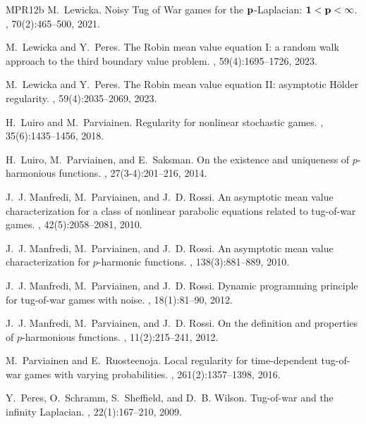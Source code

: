 \documentclass[english]{amsart}
\theoremstyle{plain}
\theoremstyle{definition}
\theoremstyle{remark}
\numberwithin{equation}{section}
\begin{document}
\begin{thebibliography}{MPR12b}
M.~Lewicka.
\newblock Noisy {T}ug of {W}ar games for the {$\bold p$}-{L}aplacian: {$\bold
  1<\bold p<\infty$}.
, 70(2):465--500, 2021.

M.~Lewicka and Y.~Peres.
\newblock The {R}obin mean value equation {I}: a random walk approach to the
  third boundary value problem.
, 59(4):1695--1726, 2023.

M.~Lewicka and Y.~Peres.
\newblock The {R}obin mean value equation {II}: asymptotic {H}\"{o}lder
  regularity.
, 59(4):2035--2069, 2023.


H.~Luiro and M.~Parviainen.
\newblock Regularity for nonlinear stochastic games.
,
  35(6):1435--1456, 2018.

H.~Luiro, M.~Parviainen, and E.~Saksman.
\newblock On the existence and uniqueness of {$p$}-harmonious functions.
, 27(3-4):201--216, 2014.

J.~J. Manfredi, M.~Parviainen, and J.~D. Rossi.
\newblock An asymptotic mean value characterization for a class of nonlinear
  parabolic equations related to tug-of-war games.
, 42(5):2058--2081, 2010.

J.~J. Manfredi, M.~Parviainen, and J.~D. Rossi.
\newblock An asymptotic mean value characterization for {$p$}-harmonic
  functions.
, 138(3):881--889, 2010.

J.~J. Manfredi, M.~Parviainen, and J.~D. Rossi.
\newblock Dynamic programming principle for tug-of-war games with noise.
, 18(1):81--90, 2012.

J.~J. Manfredi, M.~Parviainen, and J.~D. Rossi.
\newblock On the definition and properties of {$p$}-harmonious functions.
, 11(2):215--241, 2012.

M.~Parviainen and E.~Ruosteenoja.
\newblock Local regularity for time-dependent tug-of-war games with varying
  probabilities.
, 261(2):1357--1398, 2016.

Y.~Peres, O.~Schramm, S.~Sheffield, and D.~B. Wilson.
\newblock Tug-of-war and the infinity {L}aplacian.
, 22(1):167--210, 2009.



\end{thebibliography}
\end{document}
